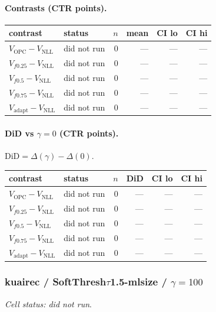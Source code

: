 \documentclass[10pt,a4paper]{article}
\begin{document}
\paragraph{Contrasts (CTR points).}
{\centering\small\begin{tabular}{llrrrr}
\toprule contrast & status & $n$ & mean & CI lo & CI hi \\
\midrule
$V_{\mathrm{OPC}}-V_{\mathrm{NLL}}$ & did not run & 0 & --- & --- & --- \\
$V_{f0.25}-V_{\mathrm{NLL}}$ & did not run & 0 & --- & --- & --- \\
$V_{f0.5}-V_{\mathrm{NLL}}$ & did not run & 0 & --- & --- & --- \\
$V_{f0.75}-V_{\mathrm{NLL}}$ & did not run & 0 & --- & --- & --- \\
$V_{\mathrm{adapt}}-V_{\mathrm{NLL}}$ & did not run & 0 & --- & --- & --- \\
\bottomrule\end{tabular}\par}
\paragraph{DiD vs $\gamma=0$ (CTR points).} $\mathrm{DiD}=\Delta(\gamma)-\Delta(0)$.
{\centering\small\begin{tabular}{llrrrr}
\toprule contrast & status & $n$ & DiD & CI lo & CI hi \\
\midrule
$V_{\mathrm{OPC}}-V_{\mathrm{NLL}}$ & did not run & 0 & --- & --- & --- \\
$V_{f0.25}-V_{\mathrm{NLL}}$ & did not run & 0 & --- & --- & --- \\
$V_{f0.5}-V_{\mathrm{NLL}}$ & did not run & 0 & --- & --- & --- \\
$V_{f0.75}-V_{\mathrm{NLL}}$ & did not run & 0 & --- & --- & --- \\
$V_{\mathrm{adapt}}-V_{\mathrm{NLL}}$ & did not run & 0 & --- & --- & --- \\
\bottomrule\end{tabular}\par}
\bigskip
\subsubsection{kuairec / SoftThresh$\tau$1.5-mlsize / $\gamma=100$}
\emph{Cell status: did not run}.
\end{document}
